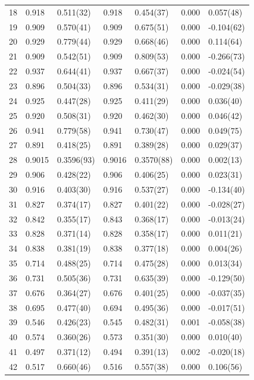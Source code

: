 \documentclass[aps, prc, tightenlines,superscriptaddress, letterpaper, amsmath, amssymb, preprintnumbers, floatfix, longbibliography, nofootinbib]{revtex4-2}
\begin{document}
\begin{table}[!htb]
{\begin{tabularx}{\textwidth}{| c || Y | Y | Y | Y | Y | Y |}
18	&	0.918	&	0.511(32)	&	0.918	&	0.454(37)	&	0.000	&	0.057(48)	\\
19	&	0.909	&	0.570(41)	&	0.909	&	0.675(51)	&	0.000	&	-0.104(62)	\\
20	&	0.929	&	0.779(44)	&	0.929	&	0.668(46)	&	0.000	&	0.114(64)	\\
21	&	0.909	&	0.542(51)	&	0.909	&	0.809(53)	&	0.000	&	-0.266(73)	\\
22	&	0.937	&	0.644(41)	&	0.937	&	0.667(37)	&	0.000	&	-0.024(54)	\\
23	&	0.896	&	0.504(33)	&	0.896	&	0.534(31)	&	0.000	&	-0.029(38)	\\
24	&	0.925	&	0.447(28)	&	0.925	&	0.411(29)	&	0.000	&	0.036(40)	\\
25	&	0.920	&	0.508(31)	&	0.920	&	0.462(30)	&	0.000	&	0.046(42)	\\
26	&	0.941	&	0.779(58)	&	0.941	&	0.730(47)	&	0.000	&	0.049(75)	\\
27	&	0.891	&	0.418(25)	&	0.891	&	0.389(28)	&	0.000	&	0.029(37)	\\
28	&	0.9015	&	0.3596(93)	&	0.9016	&	0.3570(88)	&	0.000	&	0.002(13)	\\
29	&	0.906	&	0.428(22)	&	0.906	&	0.406(25)	&	0.000	&	0.023(31)	\\
30	&	0.916	&	0.403(30)	&	0.916	&	0.537(27)	&	0.000	&	-0.134(40)	\\
31	&	0.827	&	0.374(17)	&	0.827	&	0.401(22)	&	0.000	&	-0.028(27)	\\
32	&	0.842	&	0.355(17)	&	0.843	&	0.368(17)	&	0.000	&	-0.013(24)	\\
33	&	0.828	&	0.371(14)	&	0.828	&	0.358(17)	&	0.000	&	0.011(21)	\\
34	&	0.838	&	0.381(19)	&	0.838	&	0.377(18)	&	0.000	&	0.004(26)	\\
35	&	0.714	&	0.488(25)	&	0.714	&	0.475(28)	&	0.000	&	0.013(34)	\\
36	&	0.731	&	0.505(36)	&	0.731	&	0.635(39)	&	0.000	&	-0.129(50)	\\
37	&	0.676	&	0.364(27)	&	0.676	&	0.401(25)	&	0.000	&	-0.037(35)	\\
38	&	0.695	&	0.477(40)	&	0.694	&	0.495(36)	&	0.000	&	-0.017(51)	\\
39	&	0.546	&	0.426(23)	&	0.545	&	0.482(31)	&	0.001	&	-0.058(38)	\\
40	&	0.574	&	0.360(26)	&	0.573	&	0.351(30)	&	0.000	&	0.010(40)	\\
41	&	0.497	&	0.371(12)	&	0.494	&	0.391(13)	&	0.002	&	-0.020(18)	\\
42	&	0.517	&	0.660(46)	&	0.516	&	0.557(38)	&	0.000	&	0.106(56)	\\

\end{tabularx}}
\end{table}
\end{document}
